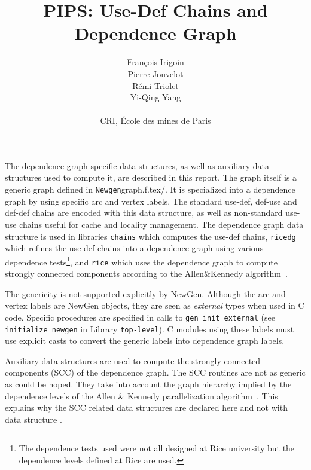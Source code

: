 \documentclass[a4paper]{article}
\title{PIPS: Use-Def Chains and Dependence Graph}
\author{Fran\c{c}ois Irigoin \\
    Pierre Jouvelot \\
    R\'emi Triolet\\
    Yi-Qing Yang \\
\\
    CRI, \'Ecole des mines de Paris}
\begin{document}
\maketitle


The dependence graph specific data structures, as well as auxiliary data
structures used to compute it, are described in this report. The graph
itself is a generic graph defined in \verb/Newgen/graph.f.tex/. It is
specialized into a dependence graph by using specific arc and vertex
labels. The standard use-def, def-use and def-def chains are encoded with
this data structure, as well as non-standard use-use chains useful for
cache and locality management. The dependence graph data structure is used
in libraries \verb/chains/ which computes the use-def chains,
\verb/ricedg/ which refines the use-def chains into a dependence graph
using various dependence tests\footnote{The dependence tests used were not
  all designed at Rice university but the dependence levels defined at
  Rice are used.}, and \verb/rice/ which uses the dependence
graph to compute strongly connected components according to the
Allen\&Kennedy algorithm~\cite{AK87}.

The genericity is not supported explicitly by NewGen\cite{JT89,JT90}. Although the arc
and vertex labels are NewGen objects, they are seen as {\em external}
types when used in C code. Specific procedures are specified in calls to
\verb/gen_init_external/ (see \verb/initialize_newgen/ in Library
\verb/top-level/). C modules using these labels must use explicit
casts to convert the generic labels into dependence graph labels.

Auxiliary data structures are used to compute the strongly connected
components (SCC) of the dependence graph. The SCC routines are not as
generic as could be hoped. They take into account the graph hierarchy
implied by the dependence levels of the Allen \& Kennedy parallelization
algorithm~\cite{AK87}. This explains why the SCC related data structures are declared
here and not with data structure
.

\begin{comment}
Les structures de donne'es suivantes sont utilise'es par la phase de
construction du graphe des de'pendances. Elles sont construites en
utilisant les structures de donne'es \verb+statement+ et \verb+effect+
qui ont e'te' de'finies dans la repre'sentation interne, ainsi que la
structure de donne'es ge'ne'riques \verb+vertex+ qui fait partie du
package \htmladdnormallink{{\em graph}}{http://www.cri.ensmp.fr/pips/graph}.
\end{comment}
\end{document}
